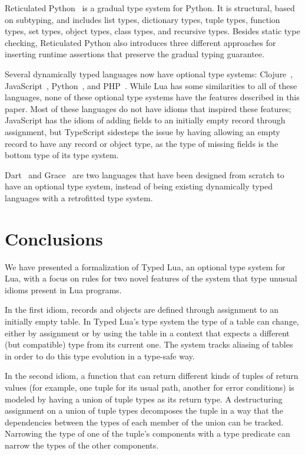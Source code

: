 \documentclass[10pt]{sigplanconf}
\begin{document}
Reticulated Python~\cite{vitousek2014deg} is a
gradual type system for Python. It is structural, based on subtyping, and includes list types,
dictionary types, tuple types, function types, set types,
object types, class types, and recursive types.
Besides static type checking, Reticulated Python also introduces
three different approaches for inserting runtime assertions
that preserve the gradual typing guarantee.

Several dynamically typed languages now have optional
type systems: Clojure~\cite{bonnaire-sergeant2015typed-clojure},
JavaScript~\cite{typescript}, Python~\cite{mypy}, 
and PHP~\cite{hack}. While Lua has some similarities to
all of these languages, none of these optional type
systems have the features described in this paper.
Most of these languages do not have idioms
that inspired these features; JavaScript has the
idiom of adding fields to an initially empty
record through assignment, but TypeScript sidesteps
the issue by having allowing an empty record to
have any record or object type, as the type of
missing fields is the bottom type of its type system.

Dart~\cite{dart} and Grace~\cite{black2013sg} are
two languages that have been designed from scratch
to have an optional type system, instead of being
existing dynamically typed languages with a retrofitted 
type system. 

\section{Conclusions}
\label{sec:conclusion}

We have presented a formalization of Typed Lua,
an optional type system for Lua, with a focus on rules
for two novel features of the system that type unusual
idioms present in Lua programs.

In the first idiom, records and objects are
defined through assignment to an initially empty
table. In Typed Lua's type system the type of a
table can change, either by assignment
or by using the table in a context that expects
a different (but compatible) type from its current one.
The system tracks aliasing of tables
in order to do this type evolution in a type-safe
way.

In the second idiom, a function that can return different
kinds of tuples of return values (for example, one
tuple for its usual path, another for error conditions)
is modeled by having a union of tuple types as its return
type. A destructuring assignment on a union of tuple types
decomposes the tuple in a way that the dependencies between
the types of each member of the union can be tracked.
Narrowing the type of one of the tuple's components with
a type predicate can narrow the types of the other
components.
\end{document}
